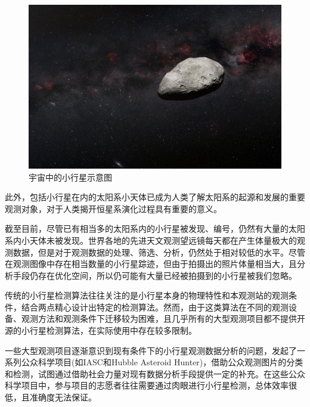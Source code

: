 \documentclass[12pt,a4paper]{article}%
\begin{document}
\begin{figure}[H]%
    \centering
    \begin{minipage}{0.83\textwidth}%
        \centering
        \includegraphics[width=1.0%
            \textwidth]{asteroid}%
        \caption{\fontsize{10pt}{15pt}\selectfont 宇宙中的小行星示意图}%
    \end{minipage}
\end{figure}

此外，包括小行星在内的太阳系小天体已成为人类了解太阳系的起源和发展的重要观测对象，对于人类揭开恒星系演化过程具有重要的意义。

截至目前，尽管已有相当多的太阳系内的小行星被发现、编号，仍然有大量的太阳系内小天体未被发现。世界各地的先进天文观测望远镜每天都在产生体量极大的观测数据，但是对于观测数据的处理、筛选、分析，仍然处于相对较低的水平。尽管在观测图像中存在相当数量的小行星踪迹，但由于拍摄出的照片体量相当大，且分析手段仍存在优化空间，所以仍可能有大量已经被拍摄到的小行星被我们忽略。

传统的小行星检测算法往往关注的是小行星本身的物理特性和本观测站的观测条件，结合两点精心设计出特定的检测算法。然而，由于这类算法在不同的观测设备、观测方法和观测条件下迁移较为困难，且几乎所有的大型观测项目都不提供开源的小行星检测算法，在实际使用中存在较多限制。

一些大型观测项目逐渐意识到现有条件下的小行星观测数据分析的问题，发起了一系列公众科学项目(如IASC和Hubble Asteroid Hunter)，借助公众观测图片的分类和检测，试图通过借助社会力量对现有数据分析手段提供一定的补充。在这些公众科学项目中，参与项目的志愿者往往需要通过肉眼进行小行星检测，总体效率很低，且准确度无法保证。
\end{document}
